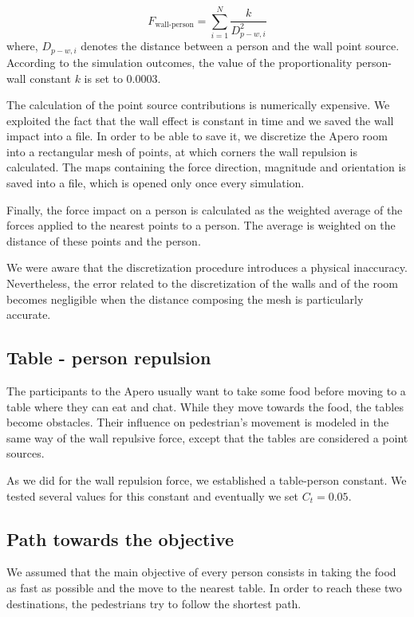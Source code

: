 \documentclass[11pt]{article}
\begin{document}
\begin{equation}
    F_{\text{wall-person}}=\sum_{i=1}^N\frac{k}{D^2_{p-w,i}}
\end{equation}
where, $D_{p-w,i}$ denotes the distance between a person and the wall point source. According to the simulation outcomes, the value of the proportionality person-wall constant $k$ is set to 0.0003.

The calculation of the point source contributions is numerically expensive. We exploited the fact that the wall effect is constant in time and we saved the wall impact into a file. In order to be able to save it, we discretize the Apero room into a rectangular mesh of points, at which corners the wall repulsion is calculated. The maps containing the force direction, magnitude and orientation is saved into a file, which is opened only once every simulation. 

Finally, the force impact on a person is calculated as the weighted average of the forces applied to the nearest points to a person. The average is weighted on the distance of these points and the person.

We were aware that the discretization procedure introduces a physical inaccuracy. Nevertheless, the error related to the discretization of the walls and of the room becomes negligible when the distance composing the mesh is particularly accurate.

\subsection{Table - person repulsion}
The participants to the Apero usually want to take some food before moving to a table where they can eat and chat. While they move towards the food, the tables become obstacles. Their influence on pedestrian's movement is modeled in the same way of the wall repulsive force, except that the tables are considered a point sources.

As we did for the wall repulsion force, we established a table-person constant. We tested several values for this constant and eventually we set $C_t = 0.05$.

\subsection{Path towards the objective}
We assumed that the main objective of every person consists in taking the food as fast as possible and the move to the nearest table. In order to reach these two destinations, the pedestrians try to follow the shortest path.
\end{document}
